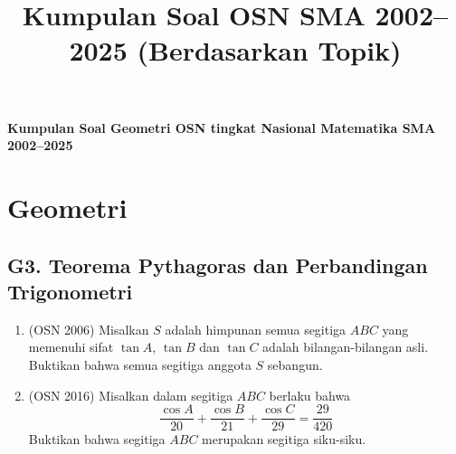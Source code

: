 \documentclass[12pt,a4paper]{article}
\begin{document}
\renewcommand*\contentsname{Daftar Isi}
\tableofcontents

\newpage
\title{Kumpulan Soal OSN SMA 2002--2025 (Berdasarkan Topik)}
\begin{center}
    \Large \textbf{Kumpulan Soal Geometri OSN tingkat Nasional Matematika SMA 2002--2025}
\end{center}
\section{Geometri}

\subsection{G3. Teorema Pythagoras dan Perbandingan Trigonometri}
\begin{enumerate}

\item (OSN 2006) Misalkan $S$ adalah himpunan semua segitiga $ABC$ yang memenuhi sifat $\tan A$, $\tan B$ dan $\tan C$ adalah bilangan-bilangan asli. Buktikan bahwa semua segitiga anggota $S$ sebangun.

\item (OSN 2016) Misalkan dalam segitiga $ABC$ berlaku bahwa
$$\frac{\cos A}{20}+\frac{\cos B}{21}+\frac{\cos C}{29}=\frac{29}{420}$$
Buktikan bahwa segitiga $ABC$ merupakan segitiga siku-siku.

\end{enumerate}
\end{document}
